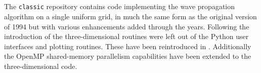 %
%
%

\subsection{\classic}
The \texttt{classic} repository contains code implementing the wave
propagation algorithm on a single uniform grid, in much the same form as the
original  version of 1994 but with various enhancements added
through the years.  Following the introduction of  the
three-dimensional routines were left out of the Python user interfaces and
plotting routines.  These have been reintroduced in .  Additionally
the OpenMP shared-memory parallelism capabilities have been extended to the
three-dimensional code.